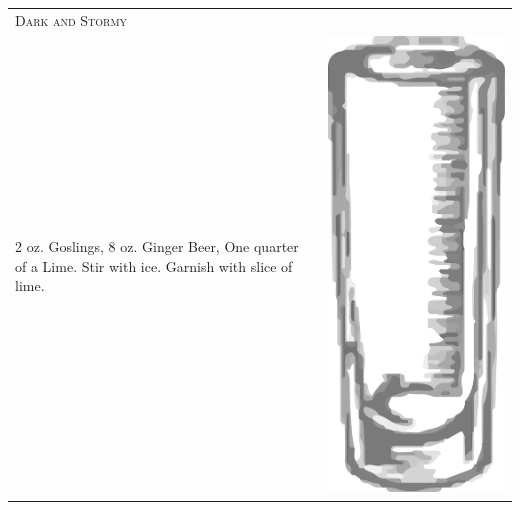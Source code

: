 \documentclass{article}
\begin{document}
\begin{multicols}{2}
\begin{tabular}{p{2in} p{0.5in}}
\multicolumn{2}{p{3in}}{\centering\Huge\textsc{Dark and Stormy}} \\ 
   \vspace{-0.1in}2 oz. Goslings, 8 oz. Ginger Beer, One quarter of a Lime. Stir with ice. Garnish with slice of lime. &
   \vspace{-0.1in} \includegraphics{collins.png}
\end{tabular}


\end{multicols}
\end{document}
